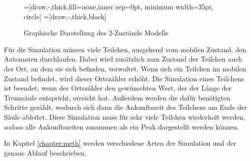 \begin{figure}[ht]
 \centering

\usetikzlibrary{arrows,%
                topaths}%
=[draw,-,thick,fill=none,inner sep=0pt, minimum width=35pt, circle]
=[draw,-,thick,black]
\usetikzlibrary{arrows,decorations.pathmorphing,backgrounds,positioning,fit}

\caption{Graphische Darstellung des 2-Zustände Modells}
\label{tikz:2p_Mod}
\end{figure}

Für die Simulation müssen viele Teilchen, ausgehend vom mobilen Zustand, den Automaten durchlaufen. Dabei wird zusätzlich zum Zustand der Teilchen auch der Ort, an dem sie sich befinden, verwaltet. Wenn sich ein Teilchen im mobilen Zustand befindet, wird dieser Ortszähler erhöht. Die Simulation eines Teilchens ist beendet, wenn der Ortszähler den gewünschten Wert, der der Länge der Trennsäule entspricht, erreicht hat.
Außerdem werden die dafür benötigten Schritte gezählt, wodurch sich dann die Ankunftszeit des Teilchens am Ende der Säule ableitet.
Diese Simulation muss für sehr viele Teilchen wiederholt werden, sodass alle Ankunftszeiten zusammen als ein Peak dargestellt werden können.


In Kapitel \ref{chapter:meth} werden verschiedene Arten der Simulation und der genaue Ablauf beschrieben.


